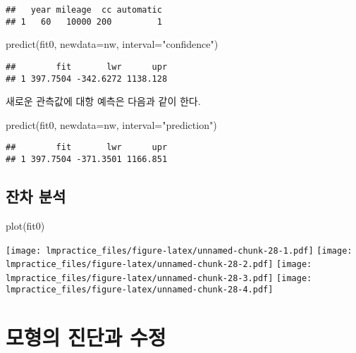 \documentclass[
]{book}
\newenvironment{Shaded}{\begin{snugshade}}{\end{snugshade}}
\newcommand{\AttributeTok}[1]{\textcolor[rgb]{0.77,0.63,0.00}{#1}}
\newcommand{\FunctionTok}[1]{\textcolor[rgb]{0.00,0.00,0.00}{#1}}
\newcommand{\NormalTok}[1]{#1}
\newcommand{\StringTok}[1]{\textcolor[rgb]{0.31,0.60,0.02}{#1}}
\begin{document}
\begin{verbatim}
##   year mileage  cc automatic
## 1   60   10000 200         1
\end{verbatim}

\begin{Shaded}
\begin{Highlighting}[]
\FunctionTok{predict}\NormalTok{(fit0, }\AttributeTok{newdata=}\NormalTok{nw, }\AttributeTok{interval=}\StringTok{"confidence"}\NormalTok{)}
\end{Highlighting}
\end{Shaded}

\begin{verbatim}
##        fit       lwr      upr
## 1 397.7504 -342.6272 1138.128
\end{verbatim}

새로운 관측값에 대항 예측은 다음과 같이 한다.

\begin{Shaded}
\begin{Highlighting}[]
\FunctionTok{predict}\NormalTok{(fit0, }\AttributeTok{newdata=}\NormalTok{nw, }\AttributeTok{interval=}\StringTok{"prediction"}\NormalTok{)}
\end{Highlighting}
\end{Shaded}

\begin{verbatim}
##        fit       lwr      upr
## 1 397.7504 -371.3501 1166.851
\end{verbatim}

\hypertarget{uxc794uxcc28-uxbd84uxc11d}{%
\section{잔차 분석}\label{uxc794uxcc28-uxbd84uxc11d}}

\begin{Shaded}
\begin{Highlighting}[]
\FunctionTok{plot}\NormalTok{(fit0)}
\end{Highlighting}
\end{Shaded}

\texttt{[image: lmpractice\_files/figure-latex/unnamed-chunk-28-1.pdf]} \texttt{[image: lmpractice\_files/figure-latex/unnamed-chunk-28-2.pdf]} \texttt{[image: lmpractice\_files/figure-latex/unnamed-chunk-28-3.pdf]} \texttt{[image: lmpractice\_files/figure-latex/unnamed-chunk-28-4.pdf]}

\hypertarget{chapter04}{%
\chapter{모형의 진단과 수정}\label{chapter04}}
\end{document}
